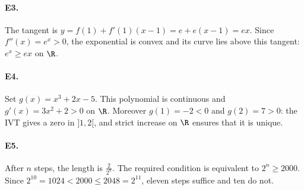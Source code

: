 \paragraph{E3.}The tangent is $y=f(1)+f'(1)(x-1)=e+e(x-1)=ex$. Since $f''(x)=e^x>0$, the exponential is convex and its curve lies above this tangent: $e^x\ge ex$ on $\R$.

\paragraph{E4.}Set $g(x)=x^3+2x-5$. This polynomial is continuous and $g'(x)=3x^2+2>0$ on $\R$. Moreover $g(1)=-2<0$ and $g(2)=7>0$: the IVT gives a zero in $]1,2[$, and strict increase on $\R$ ensures that it is unique.

\paragraph{E5.}After $n$ steps, the length is $\frac{2}{2^n}$. The required condition is equivalent to $2^n\ge2000$. Since $2^{10}=1024<2000\le2048=2^{11}$, eleven steps suffice and ten do not.


